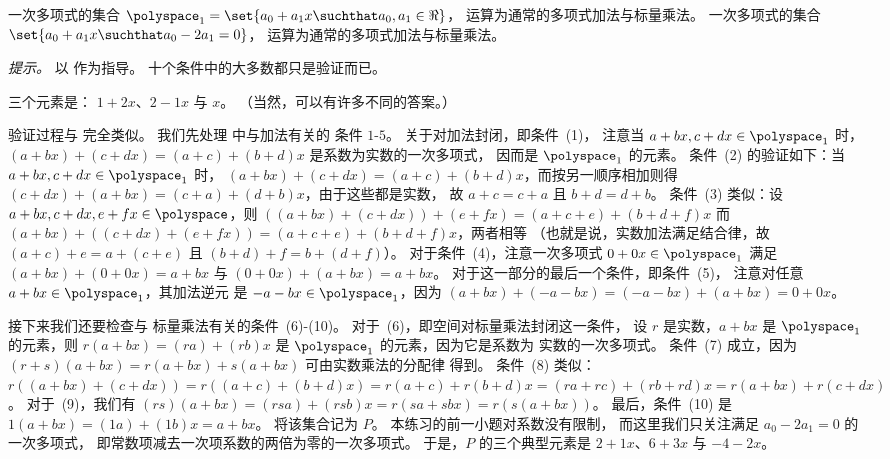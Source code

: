 \begin{exercises}
    \begin{exparts}
      \partsitem 一次多项式的集合
        \( \polyspace_1=\set{a_0+a_1x\suchthat a_0,a_1\in\Re} \)，
        运算为通常的多项式加法与标量乘法。
      \partsitem 一次多项式的集合
        \( \set{a_0+a_1x\suchthat a_0-2a_1=0} \)，
        运算为通常的多项式加法与标量乘法。
   \end{exparts}
   \textit{提示。}  以  作为指导。
   十个条件中的大多数都只是验证而已。
   \begin{answer}
      \begin{exparts}
        \partsitem
          三个元素是：
          $1+2x$、$2-1x$ 与 $x$。
          （当然，可以有许多不同的答案。）

          验证过程与  完全类似。
          我们先处理
           中与加法有关的
          条件 $1$-$5$。
          关于对加法封闭，即条件~(1)，
          注意当 $a+bx,c+dx\in\polyspace_1$ 时，
          $(a+bx)+(c+dx)=(a+c)+(b+d)x$ 是系数为实数的一次多项式，
          因而是
          $\polyspace_1$ 的元素。
          条件~(2) 的验证如下：当 $a+bx,c+dx\in\polyspace_1$ 时，
          $(a+bx)+(c+dx)=(a+c)+(b+d)x$，而按另一顺序相加则得
          $(c+dx)+(a+bx)=(c+a)+(d+b)x$，由于这些都是实数，
          故 $a+c=c+a$
          且 $b+d=d+b$。
          条件~(3) 类似：设
          $a+bx,c+dx,e+fx\in\polyspace$，则
          $((a+bx)+(c+dx))+(e+fx)=(a+c+e)+(b+d+f)x$
          而
          $(a+bx)+((c+dx)+(e+fx))=(a+c+e)+(b+d+f)x$，两者相等
          （也就是说，实数加法满足结合律，故 $(a+c)+e=a+(c+e)$
          且 $(b+d)+f=b+(d+f)$）。
          对于条件~(4)，注意一次多项式
          $0+0x\in\polyspace_1$ 满足
          $(a+bx)+(0+0x)=a+bx$ 与
          $(0+0x)+(a+bx)=a+bx$。
          对于这一部分的最后一个条件，即条件~(5)，
          注意对任意 $a+bx\in\polyspace_1$，其加法逆元
          是 $-a-bx\in\polyspace_1$，因为
          $(a+bx)+(-a-bx)=(-a-bx)+(a+bx)=0+0x$。

          接下来我们还要检查与
          标量乘法有关的条件~(6)-(10)。
          对于~(6)，即空间对标量乘法封闭这一条件，
          设 $r$ 是实数，$a+bx$ 是
          $\polyspace_1$ 的元素，则 $r(a+bx)=(ra)+(rb)x$ 是
          $\polyspace_1$ 的元素，因为它是系数为
          实数的一次多项式。
          条件~(7) 成立，因为
          $(r+s)(a+bx)=r(a+bx)+s(a+bx)$ 可由实数乘法的分配律
          得到。
          条件~(8) 类似：
          $r((a+bx)+(c+dx))=r((a+c)+(b+d)x)=r(a+c)+r(b+d)x=(ra+rc)+(rb+rd)x
          =r(a+bx)+r(c+dx)$。
          对于~(9)，我们有
          $(rs)(a+bx)=(rsa)+(rsb)x=r(sa+sbx)=r(s(a+bx))$。
          最后，条件~(10) 是
          $1(a+bx)=(1a)+(1b)x=a+bx$。
        \partsitem
          将该集合记为 $P$。
          本练习的前一小题对系数没有限制，
          而这里我们只关注满足 $a_0-2a_1=0$ 的一次多项式，
          即常数项减去一次项系数的两倍为零的一次多项式。
          于是，$P$ 的三个典型元素是
          $2+1x$、$6+3x$ 与 $-4-2x$。


\end{exparts}
\end{answer}
\end{exercises}
